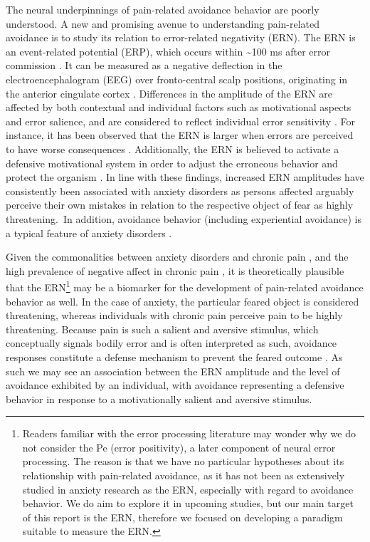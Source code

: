\documentclass[twocolumn, serif, authordate, empirical]{jote-article}
\begin{document}
The neural underpinnings of pain-related avoidance behavior are poorly understood. A new and promising avenue to understanding pain-related avoidance is to study its relation to error-related negativity (ERN). The ERN is an event-related potential (ERP), which occurs within \textasciitilde100 ms after error commission \parencite{Hajcak2012}. It can be measured as a negative deflection in the electroencephalogram (EEG) over fronto-central scalp positions, originating in the anterior cingulate cortex \parencite{Falkenstein2000, Gehring1993, Miltner2003, Taylor2007}. Differences in the amplitude of the ERN are affected by both contextual and individual factors such as motivational aspects and error salience, and are considered to reflect individual error sensitivity \parencite{Hajcak2012, Hajcak2008, Taylor2007}. For instance, it has been observed that the ERN is larger when errors are perceived to have worse consequences \parencite{Hajcak2012}. Additionally, the ERN is believed to activate a defensive motivational system in order to adjust the erroneous behavior and protect the organism \parencite{Hajcak2008}. In line with these findings, increased ERN amplitudes have consistently been associated with anxiety disorders \parencite{Weinberg2012, Hanna2020} as persons affected arguably perceive their own mistakes in relation to the respective object of fear as highly threatening.~In addition, avoidance behavior (including experiential avoidance) is a typical feature of anxiety disorders \parencite{Aupperle2010, Berman2010, Dikman2000, Dymond2009}.

Given the commonalities between anxiety disorders and chronic pain \parencite{Asmundson2009}, and the high prevalence of negative affect in chronic pain \parencite{Geisser2000}, it is theoretically plausible that the ERN\footnote{Readers familiar with the error processing literature may wonder why we do not consider the Pe (error positivity), a later component of neural error processing. The reason is that we have no particular   hypotheses about its relationship with pain-related avoidance, as it has not been as extensively studied in anxiety research as the ERN, especially with regard to avoidance behavior. We do aim to explore it in upcoming studies, but our main target of this report is the ERN, therefore we focused on developing a paradigm suitable to measure the ERN.} may be a biomarker for the development of pain-related avoidance behavior as well. In the case of anxiety, the particular feared object is considered threatening, whereas individuals with chronic pain perceive pain to be highly threatening. Because pain is such a salient and aversive stimulus, which conceptually signals bodily error and is often interpreted as such, avoidance responses constitute a defense mechanism to prevent the feared outcome \parencite{Leeuw2007}. As such we may see an association between the ERN amplitude and the level of avoidance exhibited by an individual, with avoidance representing a defensive behavior in response to a motivationally salient and aversive stimulus.~
\end{document}
